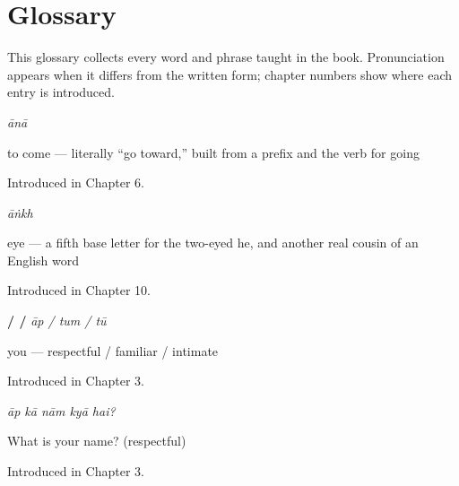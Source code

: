 
\chapter*{Glossary}

This glossary collects every word and phrase taught in the book. Pronunciation appears when it differs from the written form; chapter numbers show where each entry is introduced.

\noindent\begin{minipage}[t]{\linewidth}
\raggedright
\textbf{}\enspace\emph{ānā}\par
\small to come — literally “go toward,” built from a prefix and the verb for going\par
\footnotesize Introduced in Chapter 6.
\end{minipage}\par\medskip

\noindent\begin{minipage}[t]{\linewidth}
\raggedright
\textbf{}\enspace\emph{āṅkh}\par
\small eye — a fifth base letter for the two-eyed he, and another real cousin of an English word\par
\footnotesize Introduced in Chapter 10.
\end{minipage}\par\medskip

\noindent\begin{minipage}[t]{\linewidth}
\raggedright
\textbf{ /  / }\enspace\emph{āp / tum / tū}\par
\small you — respectful / familiar / intimate\par
\footnotesize Introduced in Chapter 3.
\end{minipage}\par\medskip

\noindent\begin{minipage}[t]{\linewidth}
\raggedright
\textbf{    }\enspace\emph{āp kā nām kyā hai?}\par
\small What is your name? (respectful)\par
\footnotesize Introduced in Chapter 3.
\end{minipage}\par\medskip

